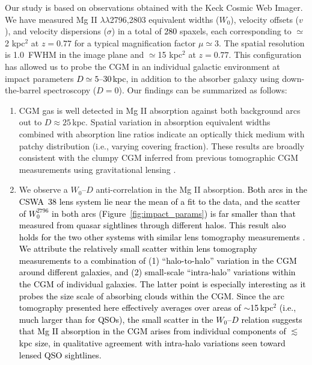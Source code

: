 \documentclass[twocolumn]{aastex62}
\newcommand{\MgII}{Mg\tiny{ }\footnotesize{II}\normalsize{ }}
\begin{document}
Our study is based on observations obtained with the Keck Cosmic Web Imager. 
We have measured \MgII $\lambda\lambda$2796,2803 equivalent widths ($W_0$), velocity offsets ($v$), and velocity dispersions ($\sigma$) in a total of \textcolor{black}{280} spaxels, each corresponding to $\simeq$2 kpc$^2$ at $z=0.77$ for a typical magnification factor $\mu\simeq3$. The spatial resolution is 1.0\arcsec~FWHM in the image plane and $\simeq$15 kpc$^2$ at $z=0.77$. This configuration has allowed us to probe the CGM in an individual galactic environment at  %
impact parameters \textcolor{black}{$D \simeq 5$--30\,kpc}, in addition to the absorber galaxy using down-the-barrel spectroscopy ($D=0$). Our findings can be summarized as follows:

\begin{enumerate}
    \item CGM gas is well detected in \MgII absorption against both background arcs out to $D\approx25$\,kpc. Spatial variation in absorption equivalent widths combined with absorption line ratios indicate an optically thick medium with patchy distribution (i.e., varying covering fraction). These results are broadly consistent with the clumpy CGM inferred from previous tomographic CGM measurements using gravitational lensing \citep{Lopez2018,Lopez2020}.
    
    \item We observe a $W_0$--$D$ anti-correlation in the \MgII absorption. 
    \textcolor{black}{Both arcs in the CSWA~38 lens system lie near the mean of a fit to the \cite{Nielsen2013a} data,  
    and the scatter of $W_0^{2796}$ in both arcs (Figure~\ref{fig:impact_params}) is far smaller than that measured from quasar sightlines through different halos. This result also holds for the two other systems with similar lens tomography measurements \citep{Lopez2018,Lopez2020}. 
    We attribute the relatively small scatter within lens tomography measurements to a combination of (1) ``halo-to-halo'' variation in the CGM around different galaxies, and (2) small-scale ``intra-halo'' variations within the CGM of individual galaxies. The latter point is especially interesting as it probes the size scale of absorbing clouds within the CGM. Since the arc tomography presented here effectively averages over areas of $\sim$15\,kpc$^2$ (i.e., much larger than for QSOs), the small scatter in the $W_0$--$D$ relation suggests that \MgII absorption in the CGM arises from individual components of $\lesssim$ kpc size, in qualitative agreement with intra-halo variations seen toward lensed QSO sightlines.}
    

\end{enumerate}
\end{document}
